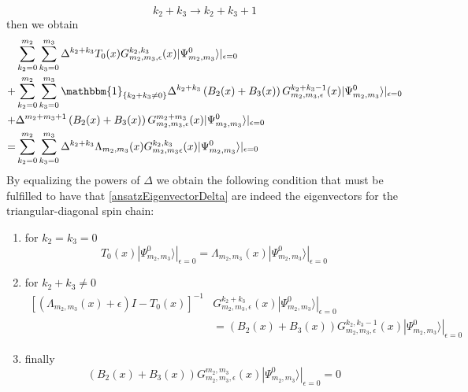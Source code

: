 \documentclass[11pt]{article}
\numberwithin{equation}{section}
\numberwithin{equation}{subsection}
\begin{document}
\begin{equation}
k_{2}+k_{3}\to k_{2}+k_{3}+1
\end{equation}
then we obtain
\begin{align*}
&\sum_{k_{2}=0}^{m_{2}}\sum_{k_{3}=0}^{m_{3}}\Delta^{k_{2}+k_{3}}T_{0}(x)G_{m_{2},m_{3},\epsilon}^{k_{2},k_{3}}(x) |\Psi_{m_{2},m_{3}}^{0}\rangle|_{\epsilon=0}
\\+&
\sum_{k_{2}=0}^{m_{2}}\sum_{k_{3}=0}^{m_{3}}\mathbbm{1}_{\{k_{2}+k_{3}\neq 0\}}\Delta^{k_{2}+k_{3}}\left(B_{2}(x)+B_{3}(x)\right)G_{m_{2},m_{3},\epsilon}^{k_{2}+k_{3}-1}(x)|\Psi_{m_{2},m_{3}}^{0}\rangle|_{\epsilon=0}
\\+&
\Delta^{m_{2}+m_{3}+1}\left(B_{2}(x)+B_{3}(x)\right)G_{m_{2},m_{3},\epsilon}^{m_{2}+m_{3}}(x)|\Psi_{m_{2},m_{3}}^{0}\rangle|_{\epsilon=0}
\\=&
\sum_{k_{2}=0}^{m_{2}}\sum_{k_{3}=0}^{m_{3}}\Delta^{k_{2}+k_{3}}\Lambda_{m_{2},m_{3}}(x)G_{m_{2},m_{3}\epsilon}^{k_{2},k_{3}}(x)|\Psi_{m_{2},m_{3}}^{0}\rangle|_{\epsilon=0}
\end{align*}
By equalizing the powers of $\Delta$ we obtain the following condition that must be fulfilled to have that \eqref{ansatzEigenvectorDelta} are indeed the eigenvectors for the triangular-diagonal spin chain:
\begin{enumerate}
\item for $k_{2}=k_{3}=0$
\begin{equation}\label{condition1}
T_{0}(x)|\Psi_{m_{2},m_{3}}^{0}\rangle|_{\epsilon=0}=\Lambda_{m_{2},m_{3}}(x)|\Psi_{m_{2},m_{3}}^{0}\rangle|_{\epsilon=0}
\end{equation}
\item for $k_{2}+k_{3}\neq 0$
\begin{equation}\label{condition2}
\begin{split}
\left[\left(\Lambda_{m_{2},m_{3}}(x)+\epsilon\right)I-T_{0}(x)\right]^{-1}&G_{m_{2},m_{3},\epsilon}^{k_{2}+k_{3}}(x)|\Psi_{m_{2},m_{3}}^{0}\rangle|_{\epsilon=0}\\&=\left(B_{2}(x)+B_{3}(x)\right)G_{m_{2},m_{3},\epsilon}^{k_{2},k_{3}-1}(x)|\Psi_{m_{2},m_{3}}^{0}\rangle|_{\epsilon=0}
\end{split}
\end{equation}
\item finally
\begin{equation}\label{condition3}
\left(B_{2}(x)+B_{3}(x)\right)G_{m_{2},m_{3},\epsilon}^{m_{2},m_{3}}(x)|\Psi_{m_{2},m_{3}}^{0}\rangle|_{\epsilon=0}=0
\end{equation}
\end{enumerate}
\end{document}
